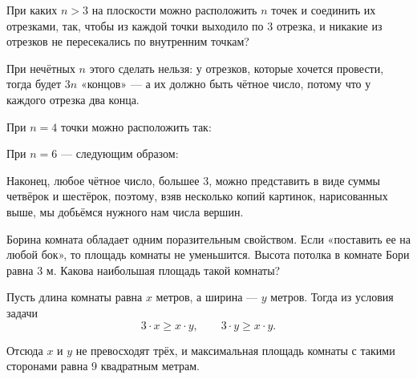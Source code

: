 
\begin{itemize}

	\itB При каких $n>3$ на плоскости можно расположить $n$ точек и соединить их отрезками, так, чтобы из каждой точки выходило по 3 отрезка, и никакие из отрезков не пересекались по внутренним точкам?
	
	\itr При нечётных $n$ этого сделать нельзя: у отрезков, которые хочется провести, тогда будет $3n$ «концов» — а их должно быть чётное число, потому что у каждого отрезка два конца.
	
	При $n=4$ точки можно расположить так:
	
	\begin{center}  \end{center}
	
	При $n=6$ — следующим образом:
	
	\begin{center}  \end{center}
	
	Наконец, любое чётное число, большее 3, можно представить в виде суммы четвёрок и шестёрок, поэтому, взяв несколько копий картинок, нарисованных выше, мы добьёмся нужного нам числа вершин.

\end{itemize}


\begin{itemize}

	\itA Борина комната обладает одним поразительным свойством. Если «поставить ее на любой бок», то площадь комнаты не уменьшится. Высота потолка в комнате Бори равна 3 м. Какова наибольшая площадь такой комнаты?
	
	\itr Пусть длина комнаты равна $x$ метров, а ширина — $y$ метров. Тогда из условия задачи
	$$3\cdot x \ge x \cdot y,\qquad 3 \cdot y \ge x \cdot y.$$
	
	Отсюда $x$ и $y$ не превосходят трёх, и максимальная площадь комнаты с такими сторонами равна 9 квадратным метрам.

\end{itemize}

